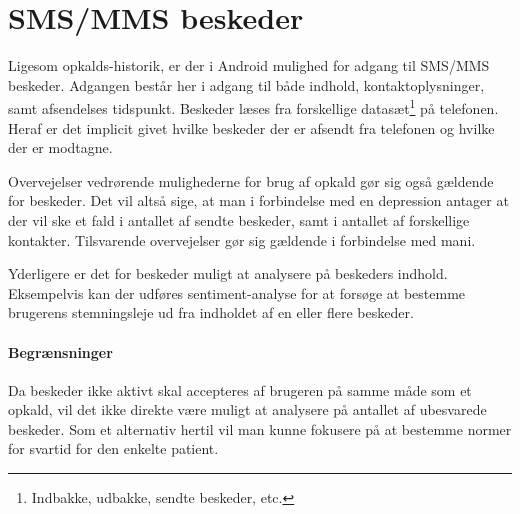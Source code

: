 \section{SMS/MMS beskeder}\label{datasamling:smsmms}
Ligesom opkalds-historik, er der i Android mulighed for adgang til SMS/MMS beskeder.
Adgangen består her i adgang til både indhold, kontaktoplysninger, samt afsendelses tidspunkt.
Beskeder læses fra forskellige datasæt\footnote{Indbakke, udbakke, sendte beskeder, etc.} på telefonen.
Heraf er det implicit givet hvilke beskeder der er afsendt fra telefonen og hvilke der er modtagne.

Overvejelser vedrørende mulighederne for brug af opkald gør sig også gældende for beskeder.
Det vil altså sige, at man i forbindelse med en depression antager at der vil ske et fald i antallet af sendte beskeder, samt i antallet af forskellige kontakter.
Tilsvarende overvejelser gør sig gældende i forbindelse med mani.

Yderligere er det for beskeder muligt at analysere på beskeders indhold.
Eksempelvis kan der udføres sentiment-analyse\cite{sentiment_analysis} for at forsøge at bestemme brugerens stemningsleje ud fra indholdet af en eller flere beskeder.

\paragraph{Begrænsninger}
Da beskeder ikke aktivt skal accepteres af brugeren på samme måde som et opkald, vil det ikke direkte være muligt at analysere på antallet af ubesvarede beskeder.
Som et alternativ hertil vil man kunne fokusere på at bestemme normer for svartid for den enkelte patient.
